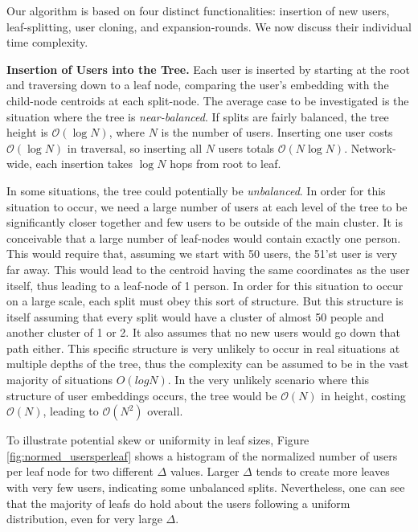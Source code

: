 \documentclass[10pt,journal]{IEEEtran}
\begin{document}
Our algorithm is based on four distinct functionalities: insertion of new users, leaf-splitting, user cloning, and expansion-rounds.
We now discuss their individual time complexity.

\textbf{Insertion of Users into the Tree.}
Each user is inserted by starting at the root and traversing down to a leaf node, comparing the user’s embedding with the child-node centroids at each split-node.
%
The average case to be investigated is the situation where the tree is \textit{near-balanced}. If splits are fairly balanced, the tree height is $\mathcal{O}(\log N)$, where $N$ is the number of users. Inserting one user costs $\mathcal{O}(\log N)$ in traversal, so inserting all $N$ users totals $\mathcal{O}(N \log N)$. Network-wide, each insertion takes $\log N$ hops from root to leaf.
    
In some situations, the tree could potentially be \textit{unbalanced}. In order for this situation to occur, we need a large number of users at each level of the tree to be significantly closer together and few users to be outside of the main cluster. It is conceivable that a large number of leaf-nodes would contain exactly one person. This would require that, assuming we start with 50 users, the 51'st user is very far away. This would lead to the centroid having the same coordinates as the user itself, thus leading to a leaf-node of 1 person. In order for this situation to occur on a large scale, each split must obey this sort of structure. But this structure is itself assuming that every split would have a cluster of almost 50 people and another cluster of 1 or 2. It also assumes that no new users would go down that path either. This specific structure is very unlikely to occur in real situations at multiple depths of the tree, thus the complexity can be assumed to be in the vast majority of situations $O(logN)$. In the very unlikely scenario where this structure of user embeddings occurs, the tree would be $\mathcal{O}(N)$ in height, costing $\mathcal{O}(N)$, leading to $\mathcal{O}(N^2)$ overall. 


To illustrate potential skew or uniformity in leaf sizes, Figure \ref{fig:normed_usersperleaf} shows a histogram of the normalized number of users per leaf node for two different $\Delta$ values. Larger $\Delta$ tends to create more leaves with very few users, indicating some unbalanced splits. Nevertheless, one can see that the majority of leafs do hold about the users following a uniform distribution, even for very large $\Delta$. %
\end{document}
